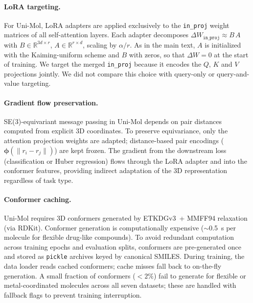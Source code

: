 \documentclass[9pt,a4paper]{article}
\begin{document}
\paragraph{LoRA targeting.}
For Uni-Mol, LoRA adapters are applied exclusively to the \texttt{in\_proj} weight
matrices of all self-attention layers.
Each adapter decomposes $\Delta W_{\texttt{in\_proj}} \approx B\,A$ with
$B \in \mathbb{R}^{3d \times r}$, $A \in \mathbb{R}^{r \times d}$, scaling by
$\alpha / r$. As in the main text, $A$ is initialized with the Kaiming-uniform scheme and $B$ with zeros, so that $\Delta W = 0$ at the start of training.
We target the merged \texttt{in\_proj} because it encodes the $Q$, $K$ and $V$ projections jointly. We did not compare this choice with query-only or query-and-value targeting.

\paragraph{Gradient flow preservation.}
SE(3)-equivariant message passing in Uni-Mol depends on pair distances computed
from explicit 3D coordinates.
To preserve equivariance, only the attention projection weights are adapted;
distance-based pair encodings ($\boldsymbol{\phi}(\|r_i - r_j\|)$) are kept frozen.
The gradient from the downstream loss (classification or Huber regression) flows
through the LoRA adapter and into the conformer features,
providing indirect adaptation of the 3D representation regardless of task type.

\paragraph{Conformer caching.}
Uni-Mol requires 3D conformers generated by ETKDGv3~+ MMFF94 relaxation (via RDKit).
Conformer generation is computationally expensive ($\sim$0.5~s per molecule for
flexible drug-like compounds).
To avoid redundant computation across training epochs and evaluation splits,
conformers are pre-generated once and stored as
\texttt{pickle} archives keyed by canonical SMILES.
During training, the data loader reads cached conformers; cache misses fall back
to on-the-fly generation. A small fraction of conformers ($<2\%$) fail to generate
for flexible or metal-coordinated molecules across all seven datasets; these are
handled with fallback flags to prevent training interruption.

\end{document}
